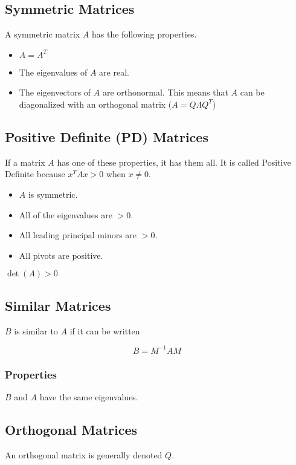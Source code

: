 \documentclass[12pt]{article}
\begin{document}
\subsection{Symmetric Matrices}
A symmetric matrix $A$ has the following properties.
\begin{itemize}
\item $A = A^T$
\item The eigenvalues of $A$ are real. 
\item The eigenvectors of $A$ are orthonormal. This means that $A$ can be diagonalized with an orthogonal matrix ($A = Q\Lambda Q^T$)
\end{itemize}

\subsection{Positive Definite (PD) Matrices}
If a matrix $A$ has one of these properties, it has them all. It is called Positive Definite because $x^TAx > 0$ when $x\neq 0$.
\begin{itemize}
\item $A$ is symmetric.
\item All of the eigenvalues are $>0$.
\item All leading principal minors are $>0$.
\item All pivots are positive.
\end{itemize}

$\det(A) > 0$

\subsection{Similar Matrices}
$B$ is similar to $A$ if it can be written

\begin{equation*}
B = M^{-1} A M
\end{equation*}

\subsubsection{Properties}
$B$ and $A$ have the same eigenvalues.

\subsection{Orthogonal Matrices}
An orthogonal matrix is generally denoted $Q$. 
\end{document}
